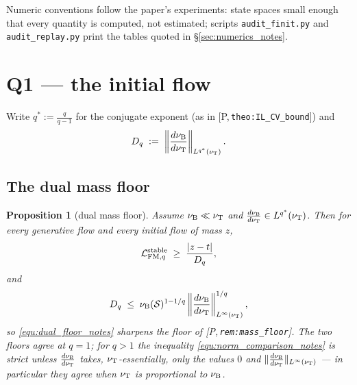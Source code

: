 \documentclass[11pt]{article}
\newtheorem{proposition}[theorem]{Proposition}
\theoremstyle{definition}
\theoremstyle{remark}
\newcommand{\paperref}[1]{[P,\,\texttt{#1}]}   %
\begin{document}
Numeric conventions follow the paper's experiments: state spaces small enough that every
quantity is computed, not estimated; scripts \texttt{audit\_finit.py} and
\texttt{audit\_replay.py} print the tables quoted in \S\ref{sec:numerics_notes}.

\section{Q1 --- the initial flow}\label{sec:finit_notes}

Write $q^*:=\frac{q}{q-1}$ for the conjugate exponent (as in
\paperref{theo:IL\_CV\_bound}) and
\begin{equation}\label{equ:dual_norm_notes}
    D_{q} \;:=\; \left\|\frac{d\nu_{\mathrm{B}}}{d\nu_{\mathrm{T}}}\right\|_{L^{q^*}(\nu_{\mathrm{T}})} .
\end{equation}

\subsection{The dual mass floor}

\begin{proposition}[dual mass floor]\label{prop:dual_floor_notes}
Assume $\nu_{\mathrm{B}}\ll\nu_{\mathrm{T}}$ and $\frac{d\nu_{\mathrm{B}}}{d\nu_{\mathrm{T}}}\in L^{q^*}(\nu_{\mathrm{T}})$. Then for every generative flow
and every initial flow of mass $z$,
\begin{equation}\label{equ:dual_floor_notes}
    \mathcal L_{\mathrm{FM},q}^{\mathrm{stable}}\;\geq\;\frac{|z-t|}{D_{q}},
\end{equation}
and
\begin{equation}\label{equ:norm_comparison_notes}
    D_{q}\;\leq\;\nu_{\mathrm{B}}(\mathcal S)^{1-1/q}\left\|\frac{d\nu_{\mathrm{B}}}{d\nu_{\mathrm{T}}}\right\|^{1/q}_{L^\infty(\nu_{\mathrm{T}})},
\end{equation}
so \eqref{equ:dual_floor_notes} sharpens the floor of \paperref{rem:mass\_floor}. The two floors
agree at $q=1$; for $q>1$ the inequality \eqref{equ:norm_comparison_notes} is strict unless
$\frac{d\nu_{\mathrm{B}}}{d\nu_{\mathrm{T}}}$ takes, $\nu_{\mathrm{T}}$-essentially, only the values $0$ and
$\|\frac{d\nu_{\mathrm{B}}}{d\nu_{\mathrm{T}}}\|_{L^\infty(\nu_{\mathrm{T}})}$ --- in particular they agree when $\nu_{\mathrm{T}}$ is
proportional to $\nu_{\mathrm{B}}$.
\end{proposition}
\end{document}
